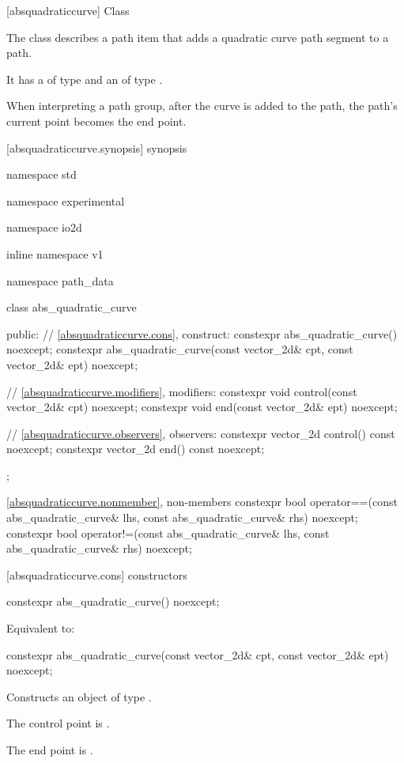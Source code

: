  [absquadraticcurve] {Class }%

\pnum
{}
The class  describes a path item that adds a quadratic \bezierlocal curve path segment to a path.

\pnum
It has a  of type  and an  of type .

\pnum
When interpreting a path group, after the curve is added to the path, the path's current point becomes the end point.

 [absquadraticcurve.synopsis] { synopsis}%

\begin{codeblock}
namespace std { namespace experimental { namespace io2d { inline namespace v1 {
  namespace path_data {
    class abs_quadratic_curve {
    public:
      // \ref{absquadraticcurve.cons}, construct:
      constexpr abs_quadratic_curve() noexcept;
      constexpr abs_quadratic_curve(const vector_2d& cpt, const vector_2d& ept)
        noexcept;

      // \ref{absquadraticcurve.modifiers}, modifiers:
      constexpr void control(const vector_2d& cpt) noexcept;
      constexpr void end(const vector_2d& ept) noexcept;

      // \ref{absquadraticcurve.observers}, observers:
      constexpr vector_2d control() const noexcept;
      constexpr vector_2d end() const noexcept;
    };
    
    \ref{absquadraticcurve.nonmember}, non-members
    constexpr bool operator==(const abs_quadratic_curve& lhs,
      const abs_quadratic_curve& rhs) noexcept;
    constexpr bool operator!=(const abs_quadratic_curve& lhs,
      const abs_quadratic_curve& rhs) noexcept;
  }
} } } }
\end{codeblock}

 [absquadraticcurve.cons] { constructors}%

%
\begin{itemdecl}
constexpr abs_quadratic_curve() noexcept;
\end{itemdecl}
\begin{itemdescr}
\pnum
\effects
Equivalent to: 
\end{itemdescr}

%
\begin{itemdecl}
constexpr abs_quadratic_curve(const vector_2d& cpt, const vector_2d& ept)
  noexcept;
\end{itemdecl}
\begin{itemdescr}
\pnum
\effects
Constructs an object of type .

\pnum
The control point is .

\pnum
The end point is .
\end{itemdescr}


